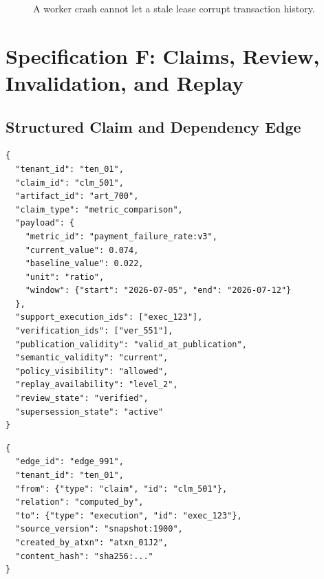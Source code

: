 \documentclass[10pt]{article}
\begin{document}
\begin{figure}[H]
\centering
{}
\caption{A worker crash cannot let a stale lease corrupt transaction history.}
\end{figure}

\Needspace{0.55\textheight}
\section{Specification F: Claims, Review, Invalidation, and Replay}

\subsection{Structured Claim and Dependency Edge}

\begin{lstlisting}[style=contract]
{
  "tenant_id": "ten_01",
  "claim_id": "clm_501",
  "artifact_id": "art_700",
  "claim_type": "metric_comparison",
  "payload": {
    "metric_id": "payment_failure_rate:v3",
    "current_value": 0.074,
    "baseline_value": 0.022,
    "unit": "ratio",
    "window": {"start": "2026-07-05", "end": "2026-07-12"}
  },
  "support_execution_ids": ["exec_123"],
  "verification_ids": ["ver_551"],
  "publication_validity": "valid_at_publication",
  "semantic_validity": "current",
  "policy_visibility": "allowed",
  "replay_availability": "level_2",
  "review_state": "verified",
  "supersession_state": "active"
}
\end{lstlisting}

\begin{lstlisting}[style=contract,title={Dependency edge}]
{
  "edge_id": "edge_991",
  "tenant_id": "ten_01",
  "from": {"type": "claim", "id": "clm_501"},
  "relation": "computed_by",
  "to": {"type": "execution", "id": "exec_123"},
  "source_version": "snapshot:1900",
  "created_by_atxn": "atxn_01J2",
  "content_hash": "sha256:..."
}
\end{lstlisting}
\end{document}
